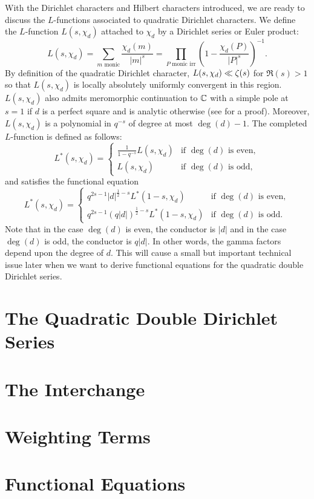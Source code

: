 \documentclass[12pt,reqno,oneside]{amsart}
\begin{document}
    With the Dirichlet characters and Hilbert characters introduced, we are ready to discuss the $L$-functions associated to quadratic Dirichlet characters. We define the $L$-function $L(s,\chi_{d})$ attached to $\chi_{d}$ by a Dirichlet series or Euler product:
    \[
        L(s,\chi_{d}) = \sum_{\text{$m$ monic}}\frac{\chi_{d}(m)}{|m|^{s}} = \prod_{\text{$P$ monic irr}}\left(1-\frac{\chi_{d}(P)}{|P|^{s}}\right)^{-1}.
    \]
    By definition of the quadratic Dirichlet character, $L(s,\chi_{d}) \ll \zeta(s)$ for $\Re(s) > 1$ so that $L(s,\chi_{d})$ is locally absolutely uniformly convergent in this region. $L(s,\chi_{d})$ also admits meromorphic continuation to $\mathbb{C}$ with a simple pole at $s = 1$ if $d$ is a perfect square and is analytic otherwise (see \cite{rosen2002number} for a proof). Moreover, $L(s,\chi_{d})$ is a polynomial in $q^{-s}$ of degree at most $\deg(d)-1$. The completed $L$-function is defined as follows:
    \[
        L^{\ast}(s,\chi_{d}) = \begin{cases} \frac{1}{1-q^{-s}}L(s,\chi_{d}) & \text{if $\deg(d)$ is even}, \\ L(s,\chi_{d}) & \text{if $\deg(d)$ is odd}, \end{cases}
    \]
    and satisfies the functional equation
    \[
        L^{\ast}(s,\chi_{d}) = \begin{cases} q^{2s-1}|d|^{\frac{1}{2}-s}L^{\ast}(1-s,\chi_{d}) & \text{if $\deg(d)$ is even}, \\ q^{2s-1}(q|d|)^{\frac{1}{2}-s}L^{\ast}(1-s,\chi_{d}) & \text{if $\deg(d)$ is odd}. \end{cases}
    \]
    Note that in the case $\deg(d)$ is even, the conductor is $|d|$ and in the case $\deg(d)$ is odd, the conductor is $q|d|$. In other words, the gamma factors depend upon the degree of $d$. This will cause a small but important technical issue later when we want to derive functional equations for the quadratic double Dirichlet series.
\section*{The Quadratic Double Dirichlet Series}
\section*{The Interchange}
\section*{Weighting Terms}
\section*{Functional Equations}
\end{document}

